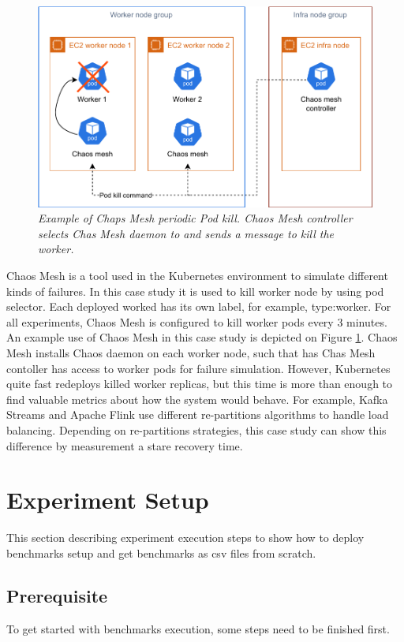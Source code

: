 \begin{figure}[ht]
    \centering
    \includegraphics[width=1\textwidth]{figures/mesh-pod-kill}
    \caption{\textit{Example of Chaps Mesh periodic Pod kill. Chaos Mesh controller selects Chas Mesh daemon to
    and sends a message to kill the worker.}}
    \label{fig:chaos-mesh-kill}
\end{figure}

Chaos Mesh \cite{chaosMesh} is a tool used in the Kubernetes environment to simulate
different kinds of failures.
In this case study it is used to kill worker node by using pod selector.
Each deployed worked has its own label, for example, type:worker.
For all experiments, Chaos Mesh is configured to kill worker pods every 3 minutes.
An example use of Chaos Mesh in this case study is depicted on Figure \ref{fig:chaos-mesh-kill}.
Chaos Mesh installs Chaos daemon on each worker node, such that has
Chas Mesh contoller has access to worker pods for failure simulation.
However, Kubernetes quite fast redeploys killed worker replicas, but this time is more than enough
to find valuable metrics about how the system would behave.
For example, Kafka Streams and Apache Flink use different re-partitions algorithms to
handle load balancing.
Depending on re-partitions strategies, this case study can show this difference by measurement
a stare recovery time.

\section{Experiment Setup}\label{sec:experiment-setup}
This section describing experiment execution steps to show how to deploy benchmarks setup and
get benchmarks as csv files from scratch.

\subsection{Prerequisite}\label{subsec:prerequisite}
To get started with benchmarks execution, some steps need to be finished first.

